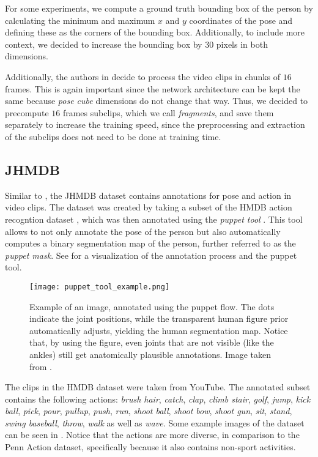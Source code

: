 For some experiments, we compute a ground truth bounding box of the person by calculating the minimum and maximum $x$ and $y$ coordinates of the pose and defining these as the corners of the bounding box.
Additionally, to include more context, we decided to increase the bounding box by $30$ pixels in both dimensions.

Additionally, the authors in \cite{luvizon_2d/3d_2018} decide to process the video clips in chunks of $16$ frames.
This is again important since the network architecture can be kept the same because \textit{pose cube} dimensions do not change that way.
Thus, we decided to precompute $16$ frames subclips, which we call \textit{fragments}, and save them separately to increase the training speed, since the preprocessing and extraction of the subclips does not need to be done at training time. 

\subsection{JHMDB}
\label{sec:exp-jhmdb}

Similar to \cite{zhang_actemes_2013} , the JHMDB dataset \cite{jhuang_towards_2013} contains annotations for pose and action in video clips.
The dataset was created by taking a subset of the HMDB action recogntion dataset \cite{kuehne_hmdb:_2011}, which was then annotated using the \textit{puppet tool} \cite{zuffi_pictorial_2012}.
This tool allows to not only annotate the pose of the person but also automatically computes a binary segmentation map of the person, further referred to as the \textit{puppet mask}.
See  for a visualization of the annotation process and the puppet tool.

\begin{figure}[htb!]
    \centering
    \texttt{[image: puppet\_tool\_example.png]}
    \caption{Example of an image, annotated using the puppet flow. The dots indicate the joint positions, while the transparent human figure prior automatically adjusts, yielding the human segmentation map. Notice that, by using the figure, even joints that are not visible (like the ankles) still get anatomically plausible annotations. Image taken from \cite{max_planck_institute_for_intelligent_systems_jhmdb_nodate}.}
    \label{fig:puppet_tool_example}
\end{figure}

The clips in the HMDB dataset were taken from YouTube.
The annotated subset contains the following actions:
\textit{brush hair}, \textit{catch}, \textit{clap}, \textit{climb stair}, \textit{golf}, \textit{jump}, \textit{kick ball}, \textit{pick}, \textit{pour}, \textit{pullup}, \textit{push}, \textit{run}, \textit{shoot ball}, \textit{shoot bow}, \textit{shoot gun}, \textit{sit}, \textit{stand}, \textit{swing baseball}, \textit{throw}, \textit{walk} as well as \textit{wave}.
Some example images of the dataset can be seen in .
Notice that the actions are more diverse, in comparison to the Penn Action dataset, specifically because it also contains non-sport activities.

